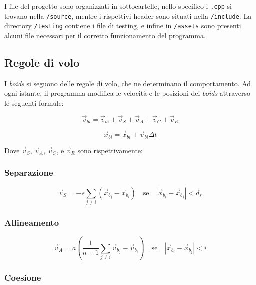 \documentclass[10pt,a4paper]{article}
\begin{document}
I file del progetto sono organizzati in sottocartelle, nello specifico i \texttt{.cpp} si trovano nella \texttt{/source}, mentre i rispettivi header sono situati nella \texttt{/include}. La directory \texttt{/testing} contiene i file di testing, e infine in \texttt{/assets} sono presenti alcuni file necessari per il corretto funzionamento del programma. 

\subsection{Regole di volo}

I \textit{boids} si seguono delle regole di volo, che ne determinano il comportamento. Ad ogni istante, il programma modifica le velocità e le posizioni dei \textit{boids} attraverso le seguenti formule:

\begin{equation*}
    \vec{v}_{bi} = \vec{v}_{bi} + \vec{v}_S + \vec{v}_A + \vec{v}_C + \vec{v}_R
\end{equation*}

\begin{equation*}
    \vec{x}_{bi} = \vec{x}_{bi} + \vec{v}_{bi} \Delta t
\end{equation*}

Dove $\vec{v}_S$, $\vec{v}_A$, $\vec{v}_C$, e $\vec{v}_R$ sono rispettivamente:

\subsubsection{Separazione}

\begin{equation*}
    \vec{v}_S = -s \sum_{j \neq i} (\vec{x}_{b_j} - \vec{x}_{b_i}) \quad \text{se} \quad \left| \vec{x}_{b_i} - \vec{x}_{b_j} \right| < d_s
\end{equation*}

\subsubsection{Allineamento}

\begin{equation*}
    \vec{v}_A = a \left( \frac{1}{n-1} \sum_{j \neq i} \vec{v}_{b_j} - \vec{v}_{b_i} \right) \quad \text{se} \quad \left| \vec{x}_{b_i} - \vec{x}_{b_j} \right| < i
\end{equation*}

\subsubsection{Coesione}
\end{document}
